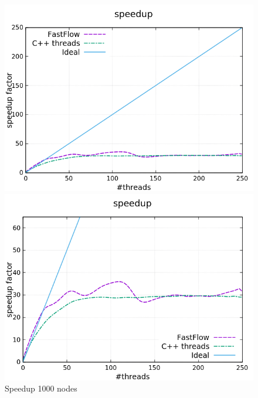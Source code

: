 \begin{figure}[H]
	\centering
	\begin{minipage}[t]{0.50\linewidth}
		\includegraphics[width=\linewidth]{benchmark/curves/speedup_standard_1000_20000.png}
		\vspace{0.2em}
	\end{minipage}%
	\begin{minipage}[t]{0.50\linewidth}
		\includegraphics[width=\linewidth]{benchmark/curves/speedup_zoom_1000_20000.png}
	\end{minipage}
	\caption{Speedup 1000 nodes}\label{fig:speedup1000}
\end{figure}

